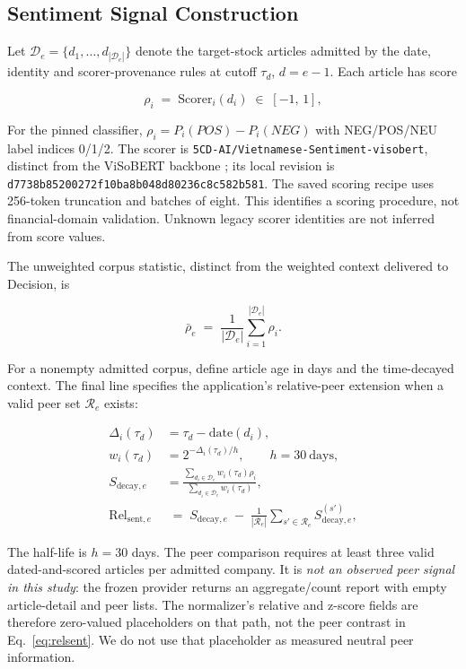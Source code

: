\subsection{Sentiment Signal Construction}
Let $\mathcal{D}_e=\{d_1,\ldots,d_{|\mathcal{D}_e|}\}$ denote the target-stock articles admitted by the date, identity and scorer-provenance rules at cutoff $\tau_d$, $d=e-1$. Each article has score

\begin{equation}
    \rho_i \;=\; \mathrm{Scorer}_i(d_i) \;\in\; [-1,\, 1],
\end{equation}


For the pinned classifier, $\rho_i=P_i(POS)-P_i(NEG)$ with NEG/POS/NEU label indices 0/1/2. The scorer is \texttt{5CD-AI/Vietnamese-Sentiment-visobert}, distinct from the ViSoBERT backbone \cite{nguyen2023visobert,hf5cdsentiment}; its local revision is \texttt{d7738b85200272f10ba8b048d80236c8c582b581}. The saved scoring recipe uses 256-token truncation and batches of eight. This identifies a scoring procedure, not financial-domain validation. Unknown legacy scorer identities are not inferred from score values.

The unweighted corpus statistic, distinct from the weighted context delivered to Decision, is

\begin{equation}
    \bar{\rho}_e \;=\;
    \frac{1}{|\mathcal{D}_e|} \sum_{i=1}^{|\mathcal{D}_e|} \rho_i.
\end{equation}


For a nonempty admitted corpus, define article age in days and the time-decayed context. The final line specifies the application's relative-peer extension when a valid peer set $\mathcal{R}_e$ exists:

\begin{align}
    \Delta_i(\tau_d) &= \tau_d - \mathrm{date}(d_i), \\
    w_i(\tau_d) &= 2^{-\Delta_i(\tau_d)/h}, \qquad h=30\ \text{days}, \\
    S_{\mathrm{decay},e}
    &= \frac{\sum_{d_i\in\mathcal{D}_e} w_i(\tau_d)\rho_i}
             {\sum_{d_i\in\mathcal{D}_e} w_i(\tau_d)},
    \label{eq:sent_decay} \\[4pt]
    \mathrm{Rel}_{\mathrm{sent},e}
    &\;=\;
    S_{\mathrm{decay},e} \;-\;
    \frac{1}{|\mathcal{R}_e|}
    \sum_{s' \in \mathcal{R}_e} S^{(s')}_{\mathrm{decay},e},
    \label{eq:relsent}
\end{align}


The half-life is $h=30$ days. The peer comparison requires at least three valid dated-and-scored articles per admitted company. It is \emph{not an observed peer signal in this study}: the frozen provider returns an aggregate/count report with empty article-detail and peer lists. The normalizer's relative and z-score fields are therefore zero-valued placeholders on that path, not the peer contrast in Eq.~\ref{eq:relsent}. We do not use that placeholder as measured neutral peer information.


